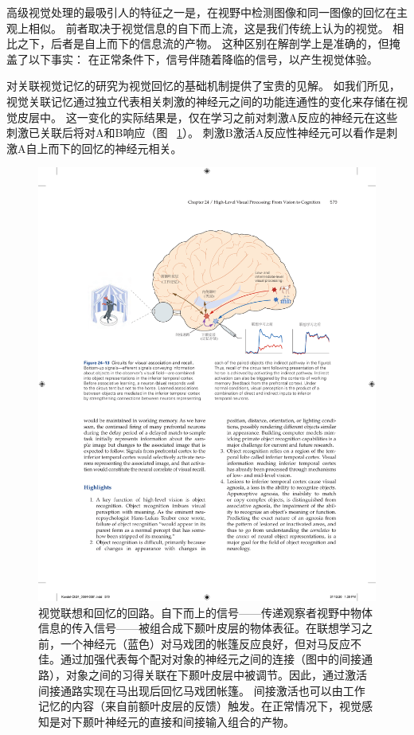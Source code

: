 高级视觉处理的最吸引人的特征之一是，在视野中检测图像和同一图像的回忆在主观上相似。
前者取决于视觉信息的自下而上流，这是我们传统上认为的视觉。
相比之下，后者是自上而下的信息流的产物。
这种区别在解剖学上是准确的，但掩盖了以下事实：
在正常条件下，信号伴随着降临的信号，以产生视觉体验。


对关联视觉记忆的研究为视觉回忆的基础机制提供了宝贵的见解。
如我们所见，视觉关联记忆通过独立代表相关刺激的神经元之间的功能连通性的变化来存储在视觉皮层中。
这一变化的实际结果是，仅在学习之前对刺激A反应的神经元在这些刺激已关联后将对A和B响应（图 ~\ref{fig:24_13}）。
刺激B激活A反应性神经元可以看作是刺激A自上而下的回忆的神经元相关。


\begin{figure}[htbp]
	\centering
	\includegraphics[width=0.9\linewidth]{chap24/fig_24_13}
	\caption{视觉联想和回忆的回路。自下而上的信号——传递观察者视野中物体信息的传入信号——被组合成下颞叶皮层的物体表征。在联想学习之前，一个神经元（蓝色）对马戏团的帐篷反应良好，但对马反应不佳。通过加强代表每个配对对象的神经元之间的连接（图中的间接通路），对象之间的习得关联在下颞叶皮层中被调节。因此，通过激活间接通路实现在马出现后回忆马戏团帐篷。 间接激活也可以由工作记忆的内容（来自前额叶皮层的反馈）触发。在正常情况下，视觉感知是对下颞叶神经元的直接和间接输入组合的产物。}
	\label{fig:24_13}
\end{figure}


